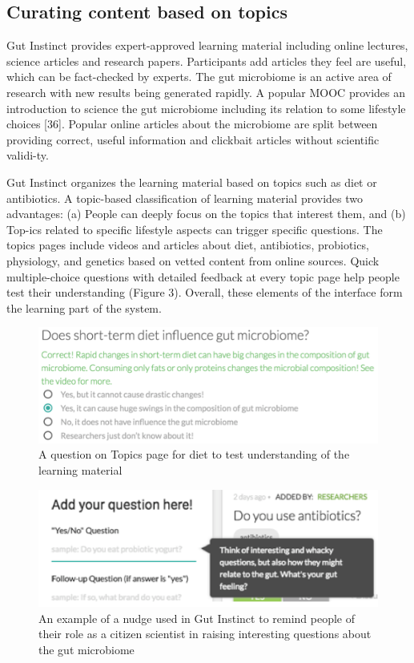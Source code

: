 \subsection{Curating content based on topics}
Gut Instinct provides expert-approved learning material including online lectures, science articles and research papers. Participants add articles they feel are useful, which can be fact-checked by experts. The gut microbiome is an active area of research with new results being generated rapidly. A popular MOOC provides an introduction to science the gut microbiome including its relation to some lifestyle choices [36]. Popular online articles about the microbiome are split between providing correct, useful information and clickbait articles without scientific validi-ty.

Gut Instinct organizes the learning material based on topics such as diet or antibiotics. A topic-based classification of learning material provides two advantages: (a) People can deeply focus on the topics that interest them, and (b) Top-ics related to specific lifestyle aspects can trigger specific questions. The topics pages include videos and articles about diet, antibiotics, probiotics, physiology, and genetics based on vetted content from online sources. Quick multiple-choice questions with detailed feedback at every topic page help people test their understanding (Figure 3). Overall, these elements of the interface form the learning part of the system. 

\begin{figure}[h] 
  \centering
  \includegraphics[width=1.0\textwidth]{figures/gutinstinct/gi-3.png}
  \caption[]
{A question on Topics page for diet to test understanding of the learning material }
  \label{fig:gi-3}
\end{figure}

\begin{figure}[h] 
  \centering
  \includegraphics[width=1.0\textwidth]{figures/gutinstinct/gi-4.png}
  \caption[]
{An example of a nudge used in Gut Instinct to remind people of their role as a citizen scientist in raising interesting questions about the gut microbiome }
  \label{fig:gi-4}
\end{figure}

